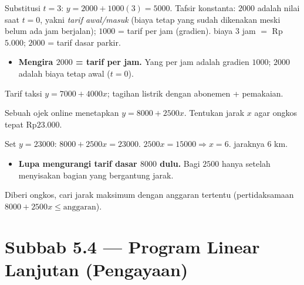 \jawab
{} Substitusi $t=3$: $y=2000+1000(3)=5000$.
 Tafsir konstanta: $2000$ adalah nilai saat $t=0$, yakni \emph{tarif
awal/masuk} (biaya tetap yang sudah dikenakan meski belum ada jam berjalan);
$1000$ = tarif per jam (gradien).
\jadi biaya $3$ jam $=$ Rp$5.000$; $2000$ = tarif dasar parkir.

\begin{jebakan}
\begin{itemize}[leftmargin=*,topsep=2pt]
  \item \textbf{Mengira $2000$ = tarif per jam.} Yang per jam adalah gradien
  $1000$; $2000$ adalah biaya tetap awal ($t=0$).
\end{itemize}
\end{jebakan}

\begin{variasi}
Tarif taksi $y=7000+4000x$; tagihan listrik dengan abonemen + pemakaian.
\end{variasi}

\begin{soalbox}{}
Sebuah ojek online menetapkan $y=8000+2500x$. Tentukan jarak $x$ agar ongkos
tepat Rp$23.000$.
\end{soalbox}

\jawab
{} Set $y=23000$: $8000+2500x=23000$.
 $2500x=15000\Rightarrow x=6$.
\jadi jaraknya $6$ km.

\begin{jebakan}
\begin{itemize}[leftmargin=*,topsep=2pt]
  \item \textbf{Lupa mengurangi tarif dasar $8000$ dulu.} Bagi $2500$ hanya
  setelah menyisakan bagian yang bergantung jarak.
\end{itemize}
\end{jebakan}

\begin{variasi}
Diberi ongkos, cari jarak maksimum dengan anggaran tertentu (pertidaksamaan
$8000+2500x\le \text{anggaran}$).
\end{variasi}

\section*{Subbab 5.4 — Program Linear Lanjutan (Pengayaan)}

